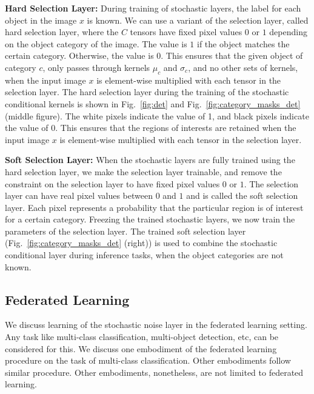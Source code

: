 \documentclass[12pt, letterpaper]{article}
\begin{document}
\noindent \textbf{Hard Selection Layer:}
During training of stochastic layers, the label for each object in the image $x$ is known. We can use a variant of the selection layer, called hard selection layer, where the $C$ tensors have fixed pixel values $0$ or $1$ depending on the object category of the image. The value is $1$ if the object matches the certain category. Otherwise, the value is $0$. This ensures that the given object of category $c$, only passes through kernels $\mu_c$ and $\sigma_c$, and no other sets of kernels, when the input image $x$ is element-wise multiplied with each tensor in the selection layer. The hard selection layer during the training of the stochastic conditional kernels is shown in Fig.~\ref{fig:det} and Fig.~\ref{fig:category_masks_det} (middle figure). The white pixels indicate the value of 1, and black pixels indicate the value of 0. This ensures that the regions of interests are retained when the input image $x$ is element-wise multiplied with each tensor in the selection layer.

\noindent \textbf{Soft Selection Layer:} When the stochastic layers are fully trained using the hard selection layer, we make the selection layer trainable, and remove the constraint on the selection layer to have fixed pixel values $0$ or $1$. The selection layer can have real pixel values between $0$ and $1$ and is called the soft selection layer. Each pixel represents a probability that the particular region is of interest for a certain category. Freezing the trained stochastic layers, we now train the parameters of the selection layer. The trained soft selection layer (Fig.~\ref{fig:category_masks_det} (right)) is used to combine the stochastic conditional layer during inference tasks, when the object categories are not known.

\subsection{Federated Learning}
\label{sec:fed}
We discuss learning of the stochastic noise layer in the federated learning setting. Any task like multi-class classification, multi-object detection, etc, can be considered for this. We discuss one embodiment of the federated learning procedure on the task of multi-class classification. Other embodiments follow similar procedure. Other embodiments, nonetheless, are not limited to federated learning.
\end{document}
